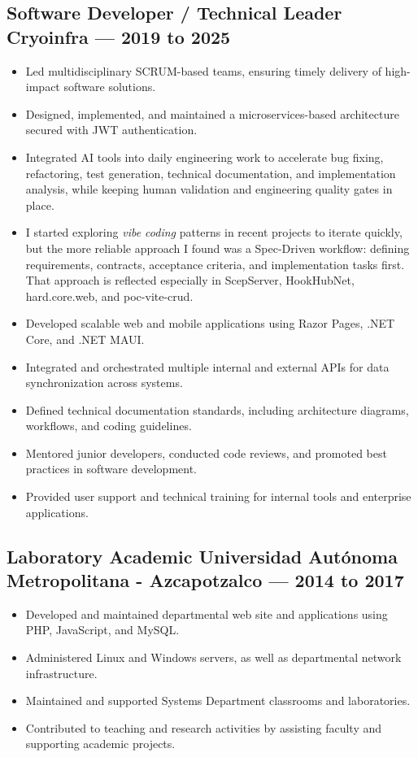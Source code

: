 \subsection*{Software Developer / Technical Leader \hfill Cryoinfra — 2019 to 2025}
\begin{itemize}[leftmargin=12pt]
    \item Led multidisciplinary SCRUM-based teams, ensuring timely delivery of high-impact software solutions.
    \item Designed, implemented, and maintained a microservices-based architecture secured with JWT authentication.
    \item Integrated AI tools into daily engineering work to accelerate bug fixing, refactoring, test generation, technical documentation, and implementation analysis, while keeping human validation and engineering quality gates in place.
    \item I started exploring \textit{vibe coding} patterns in recent projects to iterate quickly, but the more reliable approach I found was a Spec-Driven workflow: defining requirements, contracts, acceptance criteria, and implementation tasks first. That approach is reflected especially in ScepServer, HookHubNet, hard.core.web, and poc-vite-crud.
    \item Developed scalable web and mobile applications using Razor Pages, .NET Core, and .NET MAUI.
    \item Integrated and orchestrated multiple internal and external APIs for data synchronization across systems.
    \item Defined technical documentation standards, including architecture diagrams, workflows, and coding guidelines.
    \item Mentored junior developers, conducted code reviews, and promoted best practices in software development.
    \item Provided user support and technical training for internal tools and enterprise applications.
\end{itemize}

\subsection*{Laboratory Academic \hfill Universidad Autónoma Metropolitana - Azcapotzalco — 2014 to 2017}
\begin{itemize}[leftmargin=12pt]
    \item Developed and maintained departmental web site and applications using PHP, JavaScript, and MySQL.
    \item Administered Linux and Windows servers, as well as departmental network infrastructure.
    \item Maintained and supported Systems Department classrooms and laboratories.
    \item Contributed to teaching and research activities by assisting faculty and supporting academic projects.
\end{itemize}

